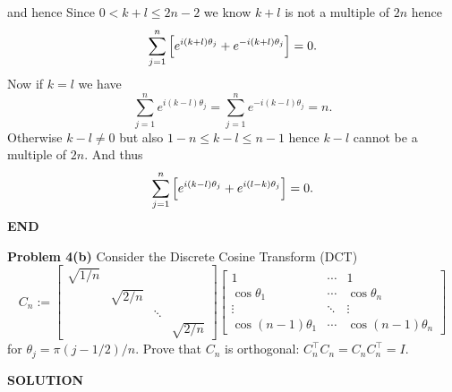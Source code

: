 \documentclass[12pt,a4paper]{article}
\begin{document}
and hence
Since $0 < k+l \ensuremath{\leq} 2n-2$ we know $k+l$ is not a multiple of $2n$ hence
\[
\ensuremath{\sum}_{j=1}^n \br[e^{i(k+l)\ensuremath{\theta}_j} + e^{-i(k+l)\ensuremath{\theta}_j}] = 0.
\]
Now if $k = l$ we have
\[
\ensuremath{\sum}_{j=1}^n e^{i(k-l)\ensuremath{\theta}_j} = \ensuremath{\sum}_{j=1}^n e^{-i(k-l)\ensuremath{\theta}_j} = n.
\]
Otherwise $k-l \ensuremath{\neq} 0$ but also $1-n \ensuremath{\leq} k-l \ensuremath{\leq} n-1$ hence $k-l$ cannot be a multiple of $2n$. And thus
\[
\ensuremath{\sum}_{j=1}^n \br[e^{i(k-l)\ensuremath{\theta}_j} + e^{i(l-k)\ensuremath{\theta}_j}] = 0.
\]
\textbf{END}

\textbf{Problem 4(b)} Consider the Discrete Cosine Transform (DCT)
\[
C_n := \begin{bmatrix}
\sqrt{1/n} \\
 & \sqrt{2/n} \\
 && \ensuremath{\ddots} \\
 &&& \sqrt{2/n}
 \end{bmatrix}
\begin{bmatrix}
    1 & \ensuremath{\cdots} & 1\\
    \cos \ensuremath{\theta}_1 & \ensuremath{\cdots} & \cos \ensuremath{\theta}_n \\
    \ensuremath{\vdots} & \ensuremath{\ddots} & \ensuremath{\vdots} \\
    \cos (n-1)\ensuremath{\theta}_1 & \ensuremath{\cdots} & \cos (n-1)\ensuremath{\theta}_n
\end{bmatrix}
\]
for $\ensuremath{\theta}_j = \ensuremath{\pi}(j-1/2)/n$. Prove that $C_n$ is orthogonal: $C_n^\ensuremath{\top} C_n = C_n C_n^\ensuremath{\top} = I$.

\textbf{SOLUTION}
\end{document}
